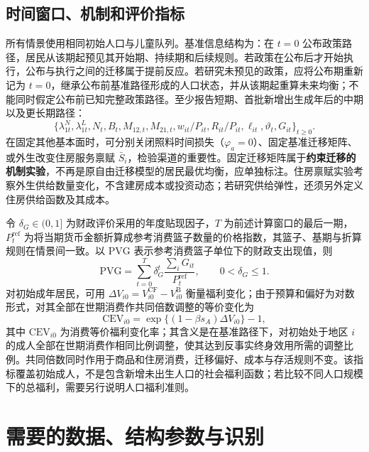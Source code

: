 \documentclass[UTF8,a4paper,zihao=-4,fontset=windows]{ctexart}
\numberwithin{equation}{section}
\newcommand{\B}{\mathrm B}
\newcommand{\CF}{\mathrm{CF}}
\begin{document}
\subsection{时间窗口、机制和评价指标}
所有情景使用相同初始人口与儿童队列。基准信息结构为：在 $t=0$ 公布政策路径，居民从该期起预见其开始期、持续期和后续规则。若政策在公布后才开始执行，公布与执行之间的迁移属于提前反应。若研究未预见的政策，应将公布期重新记为 $t=0$，继承公布前基准路径形成的人口状态，并从该期起重算未来均衡；不能同时假定公布前已知完整政策路径。至少报告短期、首批新增出生成年后的中期以及更长期路径：
\begin{equation}
  \{\lambda^N_{1t},\lambda^L_{1t},N_t,B_t,
    M_{12,t},M_{21,t},w_{it}/P_{it},R_{it}/P_{it},
    \ell_{it},\vartheta_t,G_{it}\}_{t\geq0}.
\end{equation}
在固定其他基本面时，可分别关闭照料时间损失（$\varphi_a=0$）、固定基准迁移矩阵、或外生改变住房服务禀赋 $\bar S_i$，检验渠道的重要性。固定迁移矩阵属于\textbf{约束迁移的机制实验}，不再是原自由迁移模型的居民最优均衡，应单独标注。住房禀赋实验考察外生供给数量变化，不含建房成本或投资动态；若研究供给弹性，还须另外定义住房供给函数及其成本。

令 $\delta_G\in(0,1]$ 为财政评价采用的年度贴现因子，$T$ 为前述计算窗口的最后一期，$P_t^{\mathrm{ref}}$ 为将当期货币金额折算成参考消费篮子数量的价格指数，其篮子、基期与折算规则在情景间一致。以 $\mathrm{PVG}$ 表示参考消费篮子单位下的财政支出现值，则
\begin{equation}
  \mathrm{PVG}=\sum_{t=0}^{T}\delta_G^t
      \frac{\sum_iG_{it}}{P^{\mathrm{ref}}_t},
  \qquad 0<\delta_G\leq1.
  \label{eq:fiscal-present-value}
\end{equation}
对初始成年居民，可用
$\Delta V_{i0}=V^{\CF}_{i0}-V^\B_{i0}$ 衡量福利变化；由于预算和偏好为对数形式，对其全部在世期消费作共同倍数调整的等价变化为
\begin{equation}
  \mathrm{CEV}_{i0}=\exp\{(1-\beta s_A)\Delta V_{i0}\}-1,
  \label{eq:welfare-cev}
\end{equation}
其中 $\mathrm{CEV}_{i0}$ 为消费等价福利变化率；其含义是在基准路径下，对初始处于地区 $i$ 的成人全部在世期消费作相同比例调整，使其达到反事实终身效用所需的调整比例。共同倍数同时作用于商品和住房消费，迁移偏好、成本与存活规则不变。该指标覆盖初始成人，不是包含新增未出生人口的社会福利函数；若比较不同人口规模下的总福利，需要另行说明人口福利准则。

\section{需要的数据、结构参数与识别}
\label{sec:data-parameters}
\end{document}
